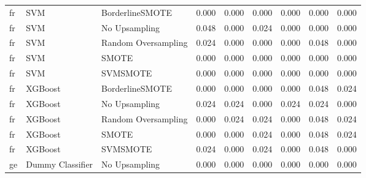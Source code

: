 \begin{tabular}{lllllllll}
      fr &                          SVM &     BorderlineSMOTE & 0.000 &                     0.000 &                 0.000 &                  0.000 &                                   0.000 &     0.000 \\
      fr &                          SVM &       No Upsampling & 0.048 &                     0.000 &                 0.024 &                  0.000 &                                   0.000 &     0.000 \\
      fr &                          SVM & Random Oversampling & 0.024 &                     0.000 &                 0.000 &                  0.000 &                                   0.048 &     0.000 \\
      fr &                          SVM &               SMOTE & 0.000 &                     0.000 &                 0.000 &                  0.000 &                                   0.000 &     0.000 \\
      fr &                          SVM &            SVMSMOTE & 0.000 &                     0.000 &                 0.000 &                  0.000 &                                   0.000 &     0.000 \\
      fr &                      XGBoost &     BorderlineSMOTE & 0.000 &                     0.000 &                 0.000 &                  0.000 &                                   0.048 &     0.024 \\
      fr &                      XGBoost &       No Upsampling & 0.024 &                     0.024 &                 0.000 &                  0.024 &                                   0.024 &     0.000 \\
      fr &                      XGBoost & Random Oversampling & 0.000 &                     0.024 &                 0.024 &                  0.000 &                                   0.048 &     0.024 \\
      fr &                      XGBoost &               SMOTE & 0.000 &                     0.000 &                 0.024 &                  0.000 &                                   0.048 &     0.024 \\
      fr &                      XGBoost &            SVMSMOTE & 0.024 &                     0.000 &                 0.024 &                  0.000 &                                   0.048 &     0.000 \\
      ge &             Dummy Classifier &       No Upsampling & 0.000 &                     0.000 &                 0.000 &                  0.000 &                                   0.000 &     0.000 \\

\end{tabular}
